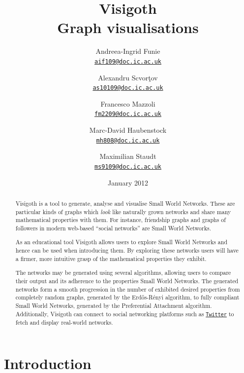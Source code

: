 \documentclass[a4paper,11pt,titlepage]{article}
\let\stdhref\href
\renewcommand{\href}[2]{\stdhref{#1}{\texttt{#2}}}
\newcommand{\mailto}[1]{\href{mailto:#1}{#1}}
\let\stdsection\section         %
\renewcommand{\section}{\newpage\stdsection}
\newcommand{\Twitter}{\href{http://twitter.com}{Twitter} }
\begin{document}
\title{\Huge Visigoth\\\Large Graph visualisations}
\author{
  Andreea-Ingrid Funie\\\mailto{aif109@doc.ic.ac.uk}\and
  Alexandru Scvor\c tov\\\mailto{as10109@doc.ic.ac.uk}\and
  Francesco Mazzoli\\\mailto{fm2209@doc.ic.ac.uk}\and
  Marc-David Haubenstock\\\mailto{mh808@doc.ic.ac.uk}\and
  Maximilian Staudt\\\mailto{ms9109@doc.ic.ac.uk}
}
\date{January 2012}
\maketitle

\begin{abstract}

Visigoth is a tool to generate, analyse and visualise Small World
Networks. These are particular kinds of graphs which \emph{look} like
naturally grown networks and share many mathematical properties with them.
For instance, friendship graphs and graphs of followers in modern
web-based ``social networks'' are Small World Networks.

As an educational tool Visigoth allows users to explore Small
World Networks and hence can be used when introducing them. By
exploring these networks users will have a firmer, more intuitive
grasp of the mathematical properties they exhibit.

The networks may be generated using several algorithms,
allowing users to compare their output and its adherence to
the properties Small World Networks. The
generated networks form a smooth progression in the number of
exhibited desired properties from completely random graphs,
generated by the Erd\H{o}s-R\'{e}nyi algorithm, to fully compliant
Small World Networks,
generated by the Preferential Attachment algorithm. Additionally,
Visigoth can connect to social networking platforms such as \Twitter to
fetch and display real-world networks.
\end{abstract}

\tableofcontents

\section{Introduction}

\end{document}
